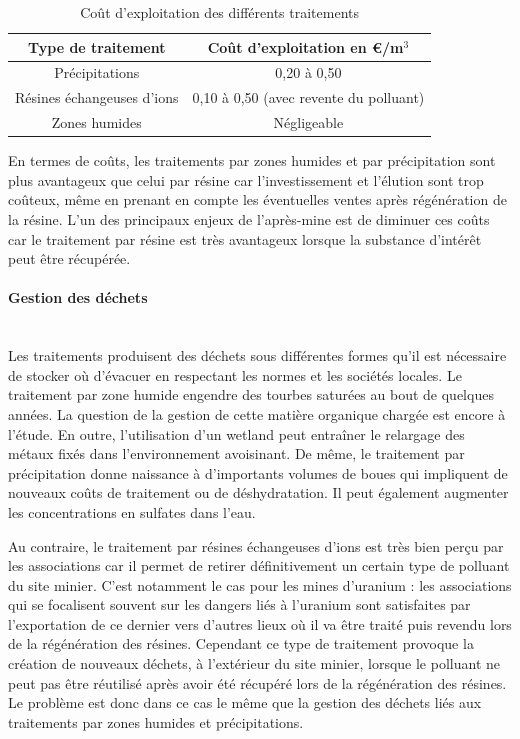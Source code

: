 \documentclass{article}
\begin{document}
\begin{table}[H]
   \centering
   \caption{Coût d'exploitation des différents traitements \cite{schick_les_2020}}
   \begin{tabular}{ |c |c |}
        \hline
        \textbf{Type de traitement} & \textbf{Coût d’exploitation en \euro{}/m$^3$} \\ 
        \hline
        Précipitations & 0,20 à 0,50 \\ 
        \hline
        Résines échangeuses d’ions & 0,10 à 0,50 (avec revente du polluant)  \\
        \hline
        Zones humides & Négligeable  \\
        \hline
    \end{tabular}
\label{tab:cout_exploitation_traitements}
\end{table}

En termes de coûts, les traitements par zones humides et par précipitation sont plus avantageux que celui par résine car l’investissement et l’élution sont trop coûteux, même en prenant en compte les éventuelles ventes après régénération de la résine. L’un des principaux enjeux de l’après-mine est de diminuer ces coûts car le traitement par résine est très avantageux lorsque la substance d'intérêt peut être récupérée.

\paragraph{Gestion des déchets \\ \\}

Les traitements produisent des déchets sous différentes formes qu’il est nécessaire de stocker où d’évacuer en respectant les normes et les sociétés locales. Le traitement par zone humide engendre des tourbes saturées au bout de quelques années. La question de la gestion de cette matière organique chargée est encore à l’étude. En outre, l’utilisation d’un wetland peut entraîner le relargage des métaux fixés dans l’environnement avoisinant. De même, le traitement par précipitation donne naissance à d’importants volumes de boues qui impliquent de nouveaux coûts de traitement ou de déshydratation. Il peut également augmenter les concentrations en sulfates dans l’eau. 

Au contraire, le traitement par résines échangeuses d’ions est très bien perçu par les associations car il permet de retirer définitivement un certain type de polluant du site minier. C’est notamment le cas pour les mines d’uranium : les associations qui se focalisent souvent sur les dangers liés à l’uranium sont satisfaites par l’exportation de ce dernier vers d’autres lieux où il va être traité puis revendu lors de la régénération des résines. Cependant ce type de traitement provoque la création de nouveaux déchets, à l’extérieur du site minier, lorsque le polluant ne peut pas être réutilisé après avoir été récupéré lors de la régénération des résines. Le problème est donc dans ce cas le même que la gestion des déchets liés aux traitements par zones humides et précipitations.
\end{document}
